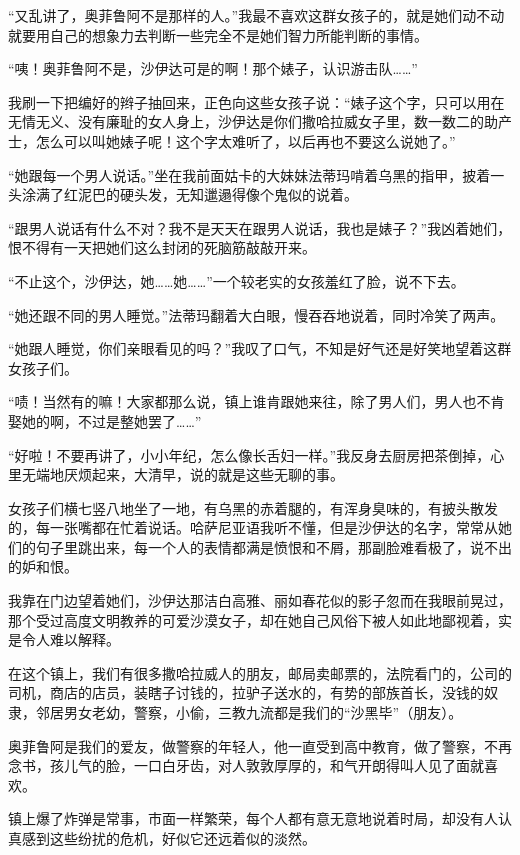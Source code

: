 \par “又乱讲了，奥菲鲁阿不是那样的人。”我最不喜欢这群女孩子的，就是她们动不动就要用自己的想象力去判断一些完全不是她们智力所能判断的事情。
\par “咦！奥菲鲁阿不是，沙伊达可是的啊！那个婊子，认识游击队……”
\par 我刷一下把编好的辫子抽回来，正色向这些女孩子说：“婊子这个字，只可以用在无情无义、没有廉耻的女人身上，沙伊达是你们撒哈拉威女子里，数一数二的助产士，怎么可以叫她婊子呢！这个字太难听了，以后再也不要这么说她了。”
\par “她跟每一个男人说话。”坐在我前面姑卡的大妹妹法蒂玛啃着乌黑的指甲，披着一头涂满了红泥巴的硬头发，无知邋遢得像个鬼似的说着。
\par “跟男人说话有什么不对？我不是天天在跟男人说话，我也是婊子？”我凶着她们，恨不得有一天把她们这么封闭的死脑筋敲敲开来。
\par “不止这个，沙伊达，她……她……”一个较老实的女孩羞红了脸，说不下去。
\par “她还跟不同的男人睡觉。”法蒂玛翻着大白眼，慢吞吞地说着，同时冷笑了两声。
\par “她跟人睡觉，你们亲眼看见的吗？”我叹了口气，不知是好气还是好笑地望着这群女孩子们。
\par “啧！当然有的嘛！大家都那么说，镇上谁肯跟她来往，除了男人们，男人也不肯娶她的啊，不过是整她罢了……”
\par “好啦！不要再讲了，小小年纪，怎么像长舌妇一样。”我反身去厨房把茶倒掉，心里无端地厌烦起来，大清早，说的就是这些无聊的事。
\par 女孩子们横七竖八地坐了一地，有乌黑的赤着腿的，有浑身臭味的，有披头散发的，每一张嘴都在忙着说话。哈萨尼亚语我听不懂，但是沙伊达的名字，常常从她们的句子里跳出来，每一个人的表情都满是愤恨和不屑，那副脸难看极了，说不出的妒和恨。
\par 我靠在门边望着她们，沙伊达那洁白高雅、丽如春花似的影子忽而在我眼前晃过，那个受过高度文明教养的可爱沙漠女子，却在她自己风俗下被人如此地鄙视着，实是令人难以解释。
\par 在这个镇上，我们有很多撒哈拉威人的朋友，邮局卖邮票的，法院看门的，公司的司机，商店的店员，装瞎子讨钱的，拉驴子送水的，有势的部族首长，没钱的奴隶，邻居男女老幼，警察，小偷，三教九流都是我们的“沙黑毕”（朋友）。
\par 奥菲鲁阿是我们的爱友，做警察的年轻人，他一直受到高中教育，做了警察，不再念书，孩儿气的脸，一口白牙齿，对人敦敦厚厚的，和气开朗得叫人见了面就喜欢。
\par 镇上爆了炸弹是常事，市面一样繁荣，每个人都有意无意地说着时局，却没有人认真感到这些纷扰的危机，好似它还远着似的淡然。
